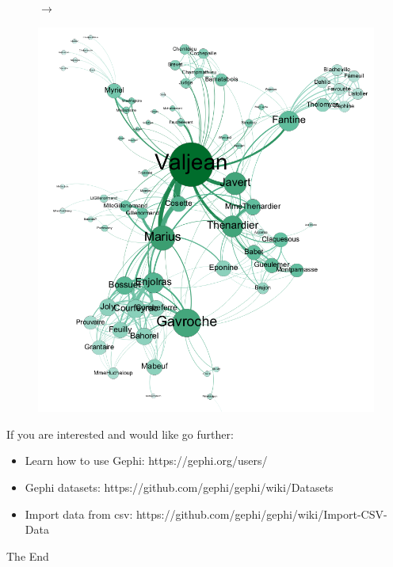 \documentclass[10pt]{beamer}
\begin{document}
\begin{frame}
\begin{figure}
\begin{minipage}{.3\textwidth}
\end{minipage}
$\rightarrow$
\begin{minipage}{.3\textwidth}
\centering
\includegraphics[width=0.8\linewidth]{figures/preview_final.png}
\end{minipage}
\end{figure}

If you are interested and would like go further:
\begin{itemize}
	\item Learn how to use Gephi: https://gephi.org/users/
	\item Gephi datasets: https://github.com/gephi/gephi/wiki/Datasets
	\item Import data from csv: https://github.com/gephi/gephi/wiki/Import-CSV-Data
\end{itemize}
\end{frame}

\begin{frame}
\Huge{\centerline{The End}}
\end{frame}

\end{document}
